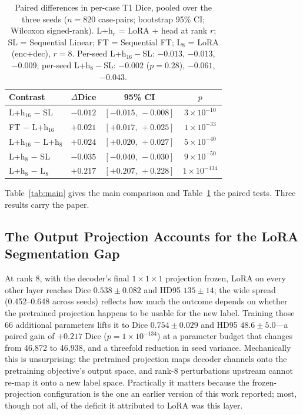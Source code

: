 \documentclass[journal,twoside,web]{ieeecolor}
\begin{document}
\begin{table}[t]
\caption{Paired differences in per-case T1 Dice, pooled over the three seeds ($n=820$ case-pairs; bootstrap 95\% CI; Wilcoxon signed-rank). L+h$_{r}$ = LoRA + head at rank $r$; SL = Sequential Linear; FT = Sequential FT; L$_8$ = LoRA (enc+dec), $r{=}8$. Per-seed L+h$_{16}-$SL: $-0.013$, $-0.013$, $-0.009$; per-seed L+h$_{8}-$SL: $-0.002$ ($p=0.28$), $-0.061$, $-0.043$.}
\label{tab:paired}
\centering
\footnotesize
\setlength{\tabcolsep}{4pt}
\begin{tabular}{lccc}
\toprule
Contrast & $\Delta$Dice & 95\% CI & $p$ \\
\midrule
L+h$_{16}$ $-$ SL         & $-0.012$ & $[-0.015,\,-0.008]$ & $3{\times}10^{-10}$ \\
FT $-$ L+h$_{16}$         & $+0.021$ & $[+0.017,\,+0.025]$ & $1{\times}10^{-33}$ \\
L+h$_{16}$ $-$ L+h$_{8}$  & $+0.024$ & $[+0.020,\,+0.027]$ & $5{\times}10^{-40}$ \\
L+h$_{8}$ $-$ SL          & $-0.035$ & $[-0.040,\,-0.030]$ & $9{\times}10^{-50}$ \\
L+h$_{8}$ $-$ L$_{8}$     & $+0.217$ & $[+0.207,\,+0.228]$ & $1{\times}10^{-134}$ \\
\bottomrule
\end{tabular}
\end{table}

Table~\ref{tab:main} gives the main comparison and Table~\ref{tab:paired} the paired tests. Three results carry the paper.

\subsection{The Output Projection Accounts for the LoRA Segmentation Gap}
\label{sec:res_head}

At rank 8, with the decoder's final $1{\times}1{\times}1$ projection frozen, LoRA on every other layer reaches Dice $0.538\pm0.082$ and HD95 $135\pm14$; the wide spread (0.452--0.648 across seeds) reflects how much the outcome depends on whether the pretrained projection happens to be usable for the new label. Training those 66 additional parameters lifts it to Dice $0.754\pm0.029$ and HD95 $48.6\pm5.0$---a paired gain of $+0.217$ Dice ($p = 1{\times}10^{-134}$) at a parameter budget that changes from 46,872 to 46,938, and a threefold reduction in seed variance. Mechanically this is unsurprising: the pretrained projection maps decoder channels onto the pretraining objective's output space, and rank-8 perturbations upstream cannot re-map it onto a new label space. Practically it matters because the frozen-projection configuration is the one an earlier version of this work reported; most, though not all, of the deficit it attributed to LoRA was this layer.
\end{document}
